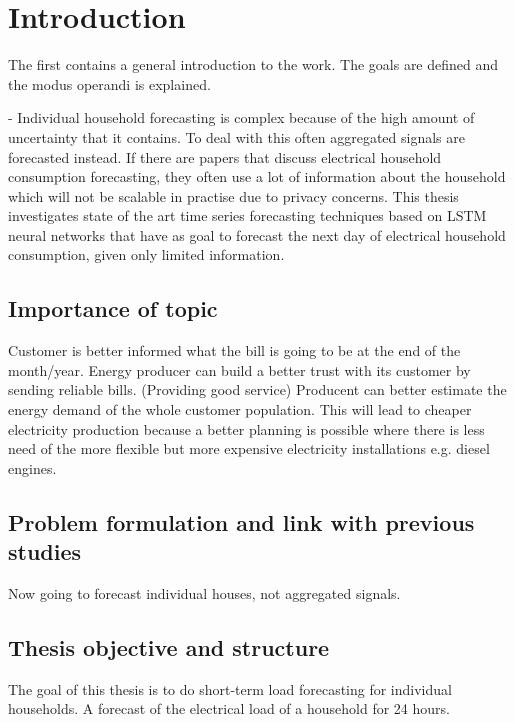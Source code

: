 \chapter{Introduction}
\label{cha:intro}

The first contains a general introduction to the work. The goals are
defined and the modus operandi is explained.

- Individual household forecasting is complex because of the high amount of uncertainty that it contains. To deal with this often aggregated signals are forecasted instead. If there are papers that discuss electrical household consumption forecasting, they often use a lot of information about the household which will not be scalable in practise due to privacy concerns. This thesis investigates state of the art time series forecasting techniques based on LSTM neural networks that have as goal to forecast the next day of electrical household consumption, given only limited information.






\section{Importance of topic}
Customer is better informed what the bill is going to be at the end of the month/year.
Energy producer can build a better trust with its customer by sending reliable bills. (Providing good service)
Producent can better estimate the energy demand of the whole customer population. This will lead to cheaper electricity production because a better planning is possible where there is less need of the more 
flexible but more expensive electricity installations e.g. diesel engines.

\section{Problem formulation and link with previous studies}
Now going to forecast individual houses, not aggregated signals. 


\section{Thesis objective and structure}
The goal of this thesis is to do short-term load forecasting for individual households. A forecast of the electrical load of a household for 24 hours. 

